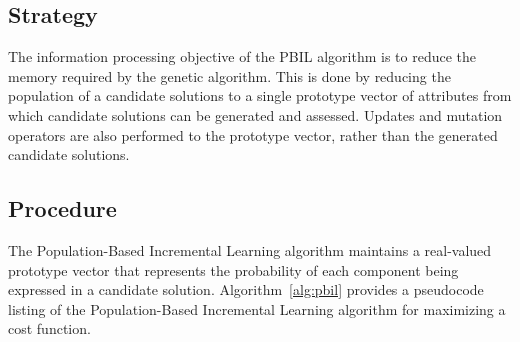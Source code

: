 \subsection{Strategy}
The information processing objective of the PBIL algorithm is to reduce the memory required by the genetic algorithm.
This is done by reducing the population of a candidate solutions to a single prototype vector of attributes from which candidate solutions can be generated and assessed. Updates and mutation operators are also performed to the prototype vector, rather than the generated candidate solutions.

\subsection{Procedure}
The Population-Based Incremental Learning algorithm maintains a real-valued prototype vector that represents the probability of each component being expressed in a candidate solution. 
Algorithm~\ref{alg:pbil} provides a pseudocode listing of the Population-Based Incremental Learning algorithm for maximizing a cost function.

